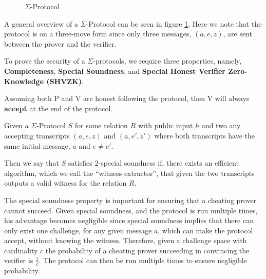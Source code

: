 \begin{figure}[ht]
  \centering
  \caption{\label{fig:proto_sigma} $\Sigma$-Protocol}
\end{figure}

A general overview of a $\Sigma$-Protocol can be seen in figure
\ref{fig:proto_sigma}. Here we note that the protocol is on a three-move form
since only three messages, $(a,e,z)$, are sent between the prover and the verifier.

\begin{definition}
\label{def:sigma:sec}
To prove the security of a $\Sigma$-protocols, we require three properties, namely,
\textbf{Completeness}, \textbf{Special Soundness}, and \textbf{Special Honest Verifier Zero-Knowledge (SHVZK)}.
\end{definition}

\begin{definition}[Completeness]
  Assuming both P and V are honest \ie following the protocol, then V will always \textbf{accept} at
  the end of the protocol.
\end{definition}

\begin{definition}
Given a $\Sigma$-Protocol $S$ for some relation $R$ with public input $h$
and two any accepting transcripts $(a,e,z)$ and $(a,e',z')$
where both transcripts have the same initial message, $a$ and $e \neq e'$.

Then we say that $S$ satisfies $2$-special soundness if, there exists an
efficient algorithm, which we call the ``witness extractor'',
that given the two transcripts outputs a valid witness for the relation $R$.
\end{definition}

The special soundness property is important for ensuring that a cheating prover
cannot succeed. Given special soundness, and the protocol is run multiple times,
his advantage becomes negligible since special soundness implies that there can
only exist one challenge, for any given message $a$, which can make the
protocol accept, without knowing the witness. Therefore, given a challenge space
with cardinality $c$ the probability of a cheating prover succeeding in
convincing the verifier is $\frac{1}{c}$. The protocol can then be run multiple
times to ensure negligible probability.

